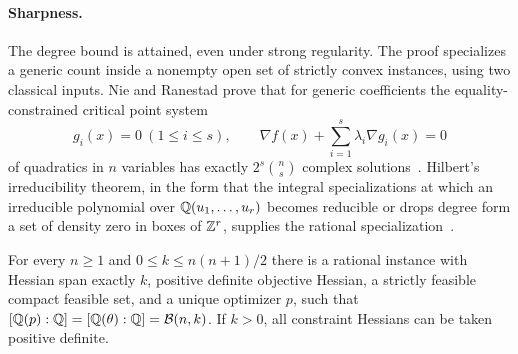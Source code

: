 \paragraph{Sharpness.}
The degree bound is attained, even under strong regularity. The proof
specializes a generic count inside a nonempty open set of strictly convex
instances, using two classical inputs. Nie and Ranestad prove that for
generic coefficients the equality-constrained critical point system
\begin{equation}
\label{eq:qc-generic-kkt}
g_i(x)=0\ (1\le i\le s),\qquad
\nabla f(x)+\sum_{i=1}^s\lambda_i\nabla g_i(x)=0
\end{equation}
of quadratics in $n$ variables has exactly $2^s\binom ns$ complex
solutions~\cite{NieRanestad2009}. Hilbert's irreducibility theorem, in the
form that the integral specializations at which an irreducible polynomial over
$\mathbb Q(u_1,\ldots,u_r)$ becomes reducible or drops degree form a set of density
zero in boxes of $\mathbb Z^r$, supplies the rational
specialization~\cite{Serre2008}.

\begin{theorem}
\label{thm:qc-sharp}
For every $n\ge1$ and $0\le k\le n(n+1)/2$ there is a rational instance with
Hessian span exactly $k$, positive definite objective Hessian, a strictly
feasible compact feasible set, and a unique optimizer $p$, such that
$[\mathbb Q(p):\mathbb Q]=[\mathbb Q(\theta):\mathbb Q]=\mathcal B(n,k)$. If $k>0$, all constraint
Hessians can be taken positive definite.
\end{theorem}

